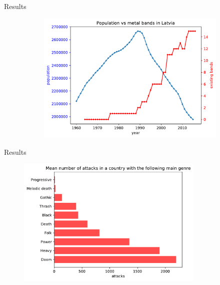 \documentclass{beamer}
\begin{document}
\begin{frame}{Results}
\begin{figure}
\begin{subfigure}[b]{0.3\textwidth}
			\includegraphics[width=\textwidth]{Population-Bands/populationVsBandLatvia}
		\end{subfigure}
	\end{figure}
\end{frame}

\begin{frame}{Results}
	
	\begin{figure}
		\includegraphics[width=0.8\textwidth]{genreVsTerrorism}
	\end{figure}
	
\end{frame}
\end{document}
